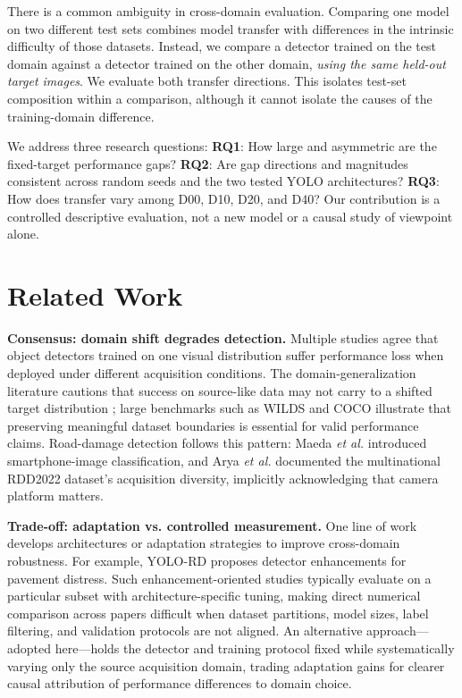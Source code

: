 \documentclass[conference,a4paper]{IEEEtran}
\begin{document}
There is a common ambiguity in cross-domain evaluation. Comparing one model on two different test sets combines model transfer with differences in the intrinsic difficulty of those datasets. Instead, we compare a detector trained on the test domain against a detector trained on the other domain, \emph{using the same held-out target images}. We evaluate both transfer directions. This isolates test-set composition within a comparison, although it cannot isolate the causes of the training-domain difference.

We address three research questions: \textbf{RQ1}: How large and asymmetric are the fixed-target performance gaps? \textbf{RQ2}: Are gap directions and magnitudes consistent across random seeds and the two tested YOLO architectures? \textbf{RQ3}: How does transfer vary among D00, D10, D20, and D40? Our contribution is a controlled descriptive evaluation, not a new model or a causal study of viewpoint alone.

\section{Related Work}
\textbf{Consensus: domain shift degrades detection.} Multiple studies agree that object detectors trained on one visual distribution suffer performance loss when deployed under different acquisition conditions. The domain-generalization literature cautions that success on source-like data may not carry to a shifted target distribution \cite{zhou2023survey}; large benchmarks such as WILDS \cite{koh2021wilds} and COCO \cite{lin2014coco} illustrate that preserving meaningful dataset boundaries is essential for valid performance claims. Road-damage detection follows this pattern: Maeda \emph{et al.} \cite{maeda2018road} introduced smartphone-image classification, and Arya \emph{et al.} \cite{arya2024rdd2022} documented the multinational RDD2022 dataset's acquisition diversity, implicitly acknowledging that camera platform matters.

\textbf{Trade-off: adaptation vs. controlled measurement.} One line of work develops architectures or adaptation strategies to improve cross-domain robustness. For example, YOLO-RD \cite{wang2025yolord} proposes detector enhancements for pavement distress. Such enhancement-oriented studies typically evaluate on a particular subset with architecture-specific tuning, making direct numerical comparison across papers difficult when dataset partitions, model sizes, label filtering, and validation protocols are not aligned. An alternative approach—adopted here—holds the detector and training protocol fixed while systematically varying only the source acquisition domain, trading adaptation gains for clearer causal attribution of performance differences to domain choice.
\end{document}
